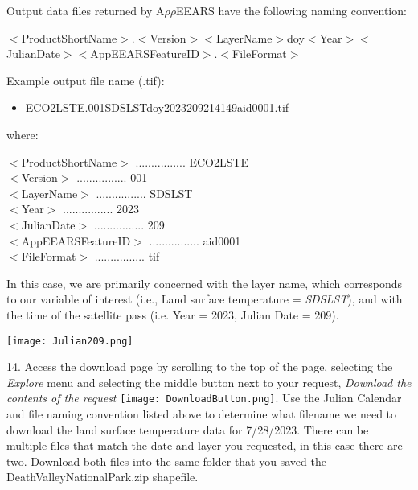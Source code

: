 \documentclass[oneside,a4paper,11pt,explicit]{book}
\begin{document}
Output data files returned by A$\rho\rho$EEARS have the following naming convention:  

\vspace{.5em}

\small{$<$ProductShortName$>$.$<$Version$>$\textunderscore $<$LayerName$>$\textunderscore doy$<$Year$>$$<$JulianDate$>$\textunderscore $<$AppEEARSFeatureID$>$.$<$FileFormat$>$}

\vspace{.5em}

Example output file name (.tif): 
\begin{itemize}
	\item ECO2LSTE.001\textunderscore SDS\textunderscore LST\textunderscore doy2023209214149\textunderscore aid0001.tif 
\end{itemize}

where: 

    $<$ProductShortName$>$ ................ ECO2LSTE \\
    $<$Version$>$ ................ 001  \\
    $<$LayerName$>$ ................ SDS\textunderscore LST \\
    $<$Year$>$ ................ 2023  \\
    $<$JulianDate$>$ ................ 209  \\
    $<$AppEEARSFeatureID$>$ ................ aid0001 \\
    $<$FileFormat$>$ ................ tif

\vspace{.5em}

In this case, we are primarily concerned with the layer name, which corresponds to our variable of interest (i.e., Land surface temperature = \textit{SDS\textunderscore LST}), and with the time of the satellite pass (i.e. Year = 2023, Julian Date = 209).

\centerline{\texttt{[image: Julian209.png]}}


14. Access the download page by scrolling to the top of the page, selecting the \textit{Explore} menu and selecting the middle button next to your request, \textit{Download the contents of the request} \texttt{[image: DownloadButton.png]}. Use the Julian Calendar and file naming convention listed above to determine what filename we need to download the land surface temperature data for 7/28/2023. There can be multiple files that match the date and layer you requested, in this case there are two. Download both files into the same folder that you saved the DeathValleyNationalPark.zip shapefile.
\end{document}
